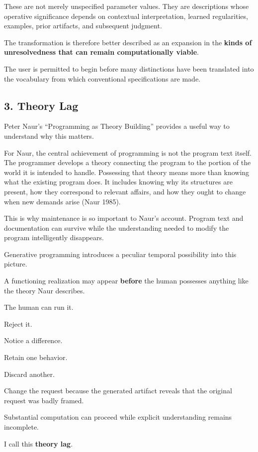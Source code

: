 \documentclass[
]{article}
\begin{document}
These are not merely unspecified parameter values. They are descriptions
whose operative significance depends on contextual interpretation,
learned regularities, examples, prior artifacts, and subsequent
judgment.

The transformation is therefore better described as an expansion in the
\textbf{kinds of unresolvedness that can remain computationally viable}.

The user is permitted to begin before many distinctions have been
translated into the vocabulary from which conventional specifications
are made.

\subsection{3. Theory Lag}\label{theory-lag}

Peter Naur's ``Programming as Theory Building'' provides a useful way to
understand why this matters.

For Naur, the central achievement of programming is not the program text
itself. The programmer develops a theory connecting the program to the
portion of the world it is intended to handle. Possessing that theory
means more than knowing what the existing program does. It includes
knowing why its structures are present, how they correspond to relevant
affairs, and how they ought to change when new demands arise (Naur
1985).

This is why maintenance is so important to Naur's account. Program text
and documentation can survive while the understanding needed to modify
the program intelligently disappears.

Generative programming introduces a peculiar temporal possibility into
this picture.

A functioning realization may appear \textbf{before} the human possesses
anything like the theory Naur describes.

The human can run it.

Reject it.

Notice a difference.

Retain one behavior.

Discard another.

Change the request because the generated artifact reveals that the
original request was badly framed.

Substantial computation can proceed while explicit understanding remains
incomplete.

I call this \textbf{theory lag}.
\end{document}
